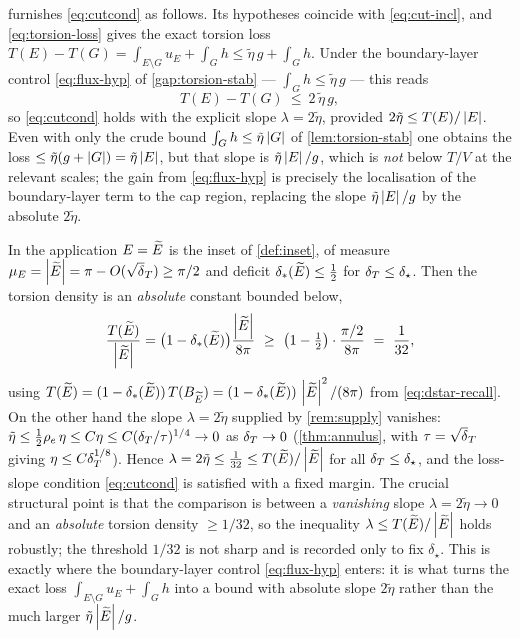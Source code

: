 \begin{remark}\label{rem:supply}
 furnishes \eqref{eq:cutcond} as follows. Its
hypotheses coincide with \eqref{eq:cut-incl}, and \eqref{eq:torsion-loss}
gives the exact torsion loss $T(E)-T(G)=\int_{E\setminus G}u_E+\int_G h\le
\tilde\eta\,g+\int_G h$. Under the boundary-layer control \eqref{eq:flux-hyp}
of \cref{gap:torsion-stab} --- $\int_G h\le\tilde\eta\,g$ --- this reads
\begin{equation}\label{eq:loss-2eta}
   T(E)-T(G)\ \le\ 2\,\tilde\eta\,g,
\end{equation}
so \eqref{eq:cutcond} holds with the explicit slope $\lambda=2\tilde\eta$,
provided $2\tilde\eta\le T(E)/\left\lvert E\right\rvert$. Even with only the crude bound
$\int_G h\le\tilde\eta\left\lvert G\right\rvert$ of \cref{lem:torsion-stab} one obtains the loss
$\le\tilde\eta(g+\left\lvert G\right\rvert)=\tilde\eta\left\lvert E\right\rvert$, but that slope is
$\tilde\eta\left\lvert E\right\rvert/g$, which is \emph{not} below $T/V$ at the relevant scales;
the gain from \eqref{eq:flux-hyp} is precisely the localisation of the
boundary-layer term to the cap region, replacing the slope $\tilde\eta\left\lvert E\right\rvert/g$ by the absolute $2\tilde\eta$.
\end{remark}

\begin{remark}\label{rem:roomtospare}
In the application $E=\widetilde{E}$ is the inset of \cref{def:inset}, of measure
$\mu_E=\abs\Etil=\pi-O(\sqrt\dT)\ge\pi/2$ and deficit
$\delta_{*}(\widetilde{E})\le\tfrac12$ for $\delta_T\le\delta_\star$. Then the torsion density
is an \emph{absolute} constant bounded below,
\[
   \frac{T(\widetilde{E})}{\left\lvert\widetilde{E}\right\rvert}
   =\bigl(1-\delta_{*}(\widetilde{E})\bigr)\frac{\left\lvert\widetilde{E}\right\rvert}{8\pi}
   \ \ge\ \bigl(1-\tfrac12\bigr)\cdot\frac{\pi/2}{8\pi}
   \ =\ \frac1{32},
\]
using $T(\widetilde{E})=(1-\delta_{*}(\widetilde{E}))\,T(B_{\widetilde{E}})=(1-\delta_{*}(\widetilde{E}))\,
\left\lvert\widetilde{E}\right\rvert^2/(8\pi)$ from \eqref{eq:dstar-recall}. On the other hand the slope
$\lambda=2\tilde\eta$ supplied by \cref{rem:supply} vanishes:
$\tilde\eta\le\tfrac12\rho_e\,\eta\le C\eta\le C(\delta_T/\tau)^{1/4}\to0$ as
$\delta_T\to0$ (\cref{thm:annulus}, with $\tau=\sqrt\dT$ giving
$\eta\le C\delta_T^{1/8}$). Hence $\lambda=2\tilde\eta\le\tfrac1{32}\le
T(\widetilde{E})/\left\lvert\widetilde{E}\right\rvert$ for all $\delta_T\le\delta_\star$, and the loss-slope
condition \eqref{eq:cutcond} is satisfied with a fixed margin. The crucial
structural point is that the comparison is between a \emph{vanishing} slope
$\lambda=2\tilde\eta\to0$ and an \emph{absolute} torsion density $\ge1/32$,
so the inequality $\lambda\le T(\widetilde{E})/\left\lvert\widetilde{E}\right\rvert$ holds robustly; the
threshold $1/32$ is not sharp and is recorded only to fix $\delta_\star$.
This is exactly where the boundary-layer control \eqref{eq:flux-hyp} enters:
it is what turns the exact loss $\int_{E\setminus G}u_E+\int_G h$ into a bound
with absolute slope $2\tilde\eta$ rather than the much larger
$\tilde\eta\left\lvert\widetilde{E}\right\rvert/g$.
\end{remark}

